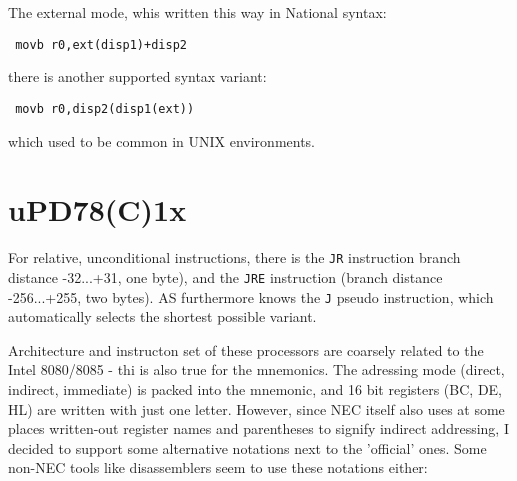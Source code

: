 \documentclass[12pt,twoside]{report}
\newcommand{\tty}[1]{{\tt #1}}
\begin{document}
The external mode, whis written this way in National syntax:
\begin{verbatim}
 movb r0,ext(disp1)+disp2
\end{verbatim}
there is another supported syntax variant:
\begin{verbatim}
 movb r0,disp2(disp1(ext))
\end{verbatim}
which used to be common in UNIX environments.


\section{uPD78(C)1x}
\label{78C1xSpec}

For relative, unconditional instructions, there is the \tty{JR} instruction
branch distance -32...+31, one byte), and the \tty{JRE} instruction (branch
distance -256...+255, two bytes).  AS furthermore knows the \tty{J} pseudo
instruction, which automatically selects the shortest possible variant.

Architecture and instructon set of these processors are coarsely
related to the Intel 8080/8085 - thi is also true for the
mnemonics.  The adressing mode (direct, indirect, immediate) is
packed into the mnemonic, and 16 bit registers (BC, DE, HL) are
written with just one letter.  However, since NEC itself also
uses at some places written-out register names and parentheses to
signify indirect addressing, I decided to support some
alternative notations next to the 'official' ones.   Some non-NEC
tools like disassemblers seem to use these notations either:
\end{document}
